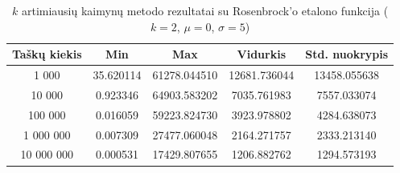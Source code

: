 \begin{table}[H]
    \centering
    \begin{tabular}{|c|c|c|c|c|}
        \hline
        \textbf{Taškų kiekis} & \textbf{Min} & \textbf{Max} & \textbf{Vidurkis} & \textbf{Std. nuokrypis} \\ \hline
        1 000        & 35.620114 & 61278.044510 & 12681.736044 & 13458.055638 \\ \hline
        10 000       & 0.923346 & 64903.583202 & 7035.761983 & 7557.033074 \\ \hline
        100 000      & 0.016059 & 59223.824730 & 3923.978802 & 4284.638073 \\ \hline
        1 000 000    & 0.007309 & 27477.060048 & 2164.271757 & 2333.213140 \\ \hline
        10 000 000   & 0.000531 & 17429.807655 & 1206.882762 & 1294.573193 \\ \hline
    \end{tabular}
    \caption{$k$ artimiausių kaimynų metodo rezultatai su Rosenbrock'o etalono funkcija ($k = 2$, $\mu = 0$, $\sigma = 5$)}
\end{table}